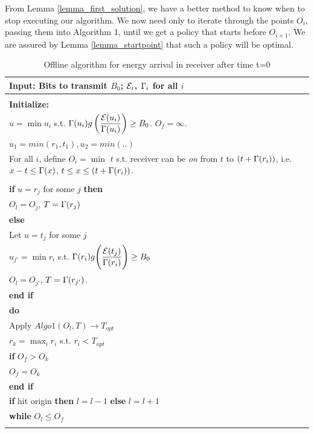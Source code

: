 From Lemma \ref{lemma_first_solution}, we have a better method to know when to stop executing our algorithm. We now need only to iterate through the points $O_i$, passing them into Algorithm 1, until we get a policy that starts before $O_{i+1}$. We are assured by Lemma \ref{lemma_startpoint} that such a policy will be optimal.
\begin{table}
\begin{minipage}[b]{8cm}
\caption {Offline algorithm for energy arrival in receiver after time t=0}
\begin{tabular}{p{7cm}}
\hline \textbf{Input}: Bits to transmit $B_0$; $\mathcal{E}_i$, $\Gamma_i$ for all $i$
\\
\hline
\\
\textbf{Initialize:}
\\ 
$u=\min u_i$ s.t. $\Gamma(u_i)g\left( \dfrac{\mathcal{E}(u_i)}{\Gamma(u_i)} \right) \ge B_0$. $O_f=\infty$.\\ $u_1=min(r_1,t_1),u_2=min(..)$
\\
For all $i$, define $O_i=\min$ $t$ s.t. receiver can be \textit{on} from $t$ to $(t+\Gamma(r_i))$, i.e. $x-t \le \Gamma(x)$,  $t \le x\le (t+\Gamma(r_i))$.
\\
\\
\textbf{if} $u=r_j$ for some $j$  \textbf{then}
\\
\hspace{4mm}$O_l=O_{j}$, $T=\Gamma(r_j)$
\\
\textbf{else}
\\
\hspace{4mm}Let $u=t_j$ for some $j$
\\
\hspace{4mm}$u_{j'}=\min r_i$ s.t. $\Gamma(r_i)g\Bigg{(} \dfrac{\mathcal{E}(t_j)}{\Gamma(r_i)}\Bigg{)}\ge B_0$
\\
\hspace{4mm}$O_l=O_{j'}$, $T=\Gamma(r_{j'})$.
\\
\textbf{end if}
\\
\textbf{do}
\\
\hspace{4mm}Apply $Algo1(O_l,T)\rightarrow T_{opt}$
\\
\hspace{4mm}$r_k=\max_i r_i $ s.t. $r_i<T_{opt}$ 
\\
\hspace{4mm}\textbf{if} $O_{f} > O_{k}$
\\
\hspace{7mm}$O_{f} = O_{k}$
\\
\hspace{4mm}\textbf{end if}
\\
\hspace{4mm}\textbf{if} hit origin \textbf{then} $l=l-1$ \textbf{else} $l=l+1$
\\
\textbf{while} $O_l \le O_{f}$
\\
\hline
\label{online}
\end{tabular}
\end{minipage}
\end{table}
